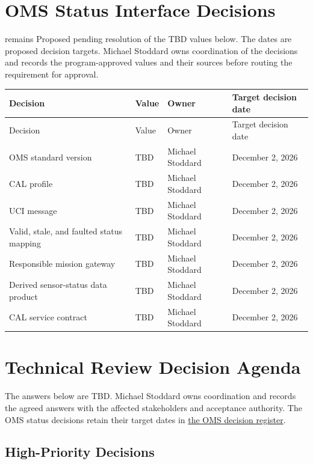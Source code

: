 \section{OMS Status Interface Decisions}
 remains Proposed pending resolution of the
TBD values below. The dates are proposed decision targets. Michael Stoddard
owns coordination of the decisions and records the program-approved values
and their sources before routing the requirement for approval.

\small
\begin{tabularx}{\linewidth}{YL{1.2cm}L{3.5cm}L{3.45cm}}
\caption{OMS Status Interface Decisions\label{Table:OMSStatusDecisions}}\\
\toprule
Decision & Value & Owner & Target decision date\\\midrule
\endfirsthead
\toprule
Decision & Value & Owner & Target decision date\\\midrule
\endhead
\bottomrule
\endlastfoot
OMS standard version & TBD & Michael Stoddard & December 2, 2026\\
CAL profile & TBD & Michael Stoddard & December 2, 2026\\
UCI message & TBD & Michael Stoddard & December 2, 2026\\
Valid, stale, and faulted status mapping & TBD & Michael Stoddard & December 2, 2026\\
Responsible mission gateway & TBD & Michael Stoddard & December 2, 2026\\
Derived sensor-status data product & TBD & Michael Stoddard & December 2, 2026\\
CAL service contract & TBD & Michael Stoddard & December 2, 2026\\
\end{tabularx}
\normalsize

\section{Technical Review Decision Agenda}
\label{Section:ReviewDecisions}
The answers below are TBD. Michael Stoddard owns coordination and records
the agreed answers with the affected stakeholders and acceptance authority.
The OMS status decisions retain their target dates in
\hyperref[Table:OMSStatusDecisions]{the OMS decision register}.

\subsection{High-Priority Decisions}


